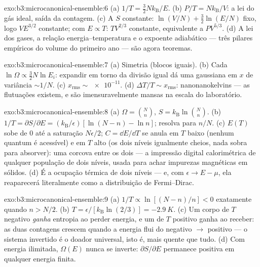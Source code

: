 \begin{solution}{exo:b3:microcanonical-ensemble:6}
(a) $1/T = \tfrac32 Nk_{\text{B}}/E$. (b) $P/T =
Nk_{\text{B}}/V$: a lei do gás ideal, saída da contagem. (c) A $S$
constante: $\ln(V/N) + \tfrac32\ln(E/N)$ fixo, logo $VE^{3/2}$
constante; com $E \propto T$: $TV^{2/3}$ constante, equivalente a
$PV^{5/3}$. (d) A lei dos gases, a relação energia--temperatura e o
expoente adiabático --- três pilares empíricos do volume do primeiro
ano --- são agora teoremas.
\end{solution}

\begin{solution}{exo:b3:microcanonical-ensemble:7}
(a) Simetria (blocos iguais). (b) Cada $\ln\Omega \propto
\tfrac32 N\ln E_i$: expandir em torno da divisão igual dá uma
gaussiana em $x$ de variância $\sim1/N$. (c) $x_{\text{rms}} \sim
\num{e-11}$. (d) $\Delta T/T \sim x_{\text{rms}}$: nanonanokelvins ---
as flutuações existem, e são imensuravelmente mansas na escala do
laboratório.
\end{solution}

\begin{solution}{exo:b3:microcanonical-ensemble:8}
(a) $\Omega = \binom Nn$, $S = k_{\text{B}}\ln\binom Nn$. (b)
$1/T = \partial S/\partial E = (k_{\text{B}}/\epsilon)[\ln(N-n) -
\ln n]$; resolva para $n/N$. (c) $E(T)$ sobe de $0$ até a saturação
$N\epsilon/2$; $C = \dd E/\dd T$ se anula em $T$ baixo (nenhum quantum
é acessível) e em $T$ alto (os dois níveis igualmente cheios, nada
sobra para absorver): uma corcova entre os dois --- a impressão digital
calorimétrica de qualquer população de dois níveis, usada para achar
impurezas magnéticas em sólidos. (d) É a ocupação térmica de dois
níveis --- e, com $\epsilon \to E - \mu$, ela reaparecerá literalmente
como a distribuição de Fermi--Dirac.
\end{solution}

\begin{solution}{exo:b3:microcanonical-ensemble:9}
(a) $1/T \propto \ln[(N-n)/n] < 0$ exatamente quando $n > N/2$. (b)
$T = \epsilon/[k_{\text{B}}\ln(2/3)] = -\qty{2.9}{K}$. (c) Um corpo de
$T$ negativo \emph{ganha} entropia ao perder energia, e um de $T$
positivo ganha ao receber: as duas contagens crescem quando a energia
flui do negativo $\to$ positivo --- o sistema invertido é o doador
universal, isto é, mais quente que tudo. (d) Com energia ilimitada,
$\Omega(E)$ nunca se inverte: $\partial S/\partial E$ permanece
positiva em qualquer energia finita.
\end{solution}

